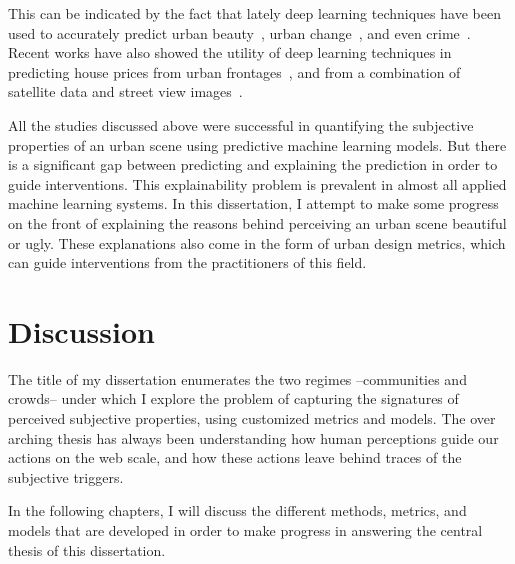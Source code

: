 This can be indicated by the fact that lately deep learning techniques have been used to accurately predict urban beauty~\cite{dubey2016deep,seresinhe2017using}, urban change~\cite{naik2017computer}, and even crime~\cite{DeNadai16,arietta2014city}.  Recent works have also showed the utility of deep learning techniques in predicting house prices from urban frontages~\cite{frontage}, and from a combination of satellite data and street view images~\cite{law2019take}.

All the studies discussed above were successful in quantifying the subjective properties of an urban scene using predictive machine learning models. But there is a significant gap between predicting and explaining the prediction in order to guide interventions. This explainability problem is prevalent in almost all applied machine learning systems. In this dissertation, I attempt to make some progress on the front of explaining the reasons behind perceiving an urban scene beautiful or ugly. These explanations also come in the form of urban design metrics, which can guide interventions from the practitioners of this field.

\section{Discussion}

The title of my dissertation enumerates the two regimes --communities and crowds-- under which I explore the problem of capturing the signatures of perceived subjective properties, using customized metrics and models. The over arching thesis has always been understanding how human perceptions guide our actions on the web scale, and how these actions leave behind traces of the subjective triggers.

In the following chapters, I will discuss the different methods, metrics, and models that are developed in order to make progress in answering the central thesis of this dissertation.


